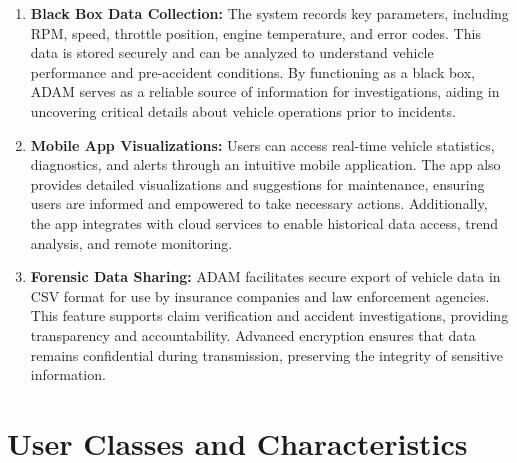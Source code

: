 \begin{enumerate}
    \item \textbf{Black Box Data Collection:} The system records key parameters, including RPM, speed, throttle position, engine temperature, and error codes. This data is stored securely and can be analyzed to understand vehicle performance and pre-accident conditions. By functioning as a black box, ADAM serves as a reliable source of information for investigations, aiding in uncovering critical details about vehicle operations prior to incidents.

    \item \textbf{Mobile App Visualizations:} Users can access real-time vehicle statistics, diagnostics, and alerts through an intuitive mobile application. The app also provides detailed visualizations and suggestions for maintenance, ensuring users are informed and empowered to take necessary actions. Additionally, the app integrates with cloud services to enable historical data access, trend analysis, and remote monitoring.
    \item \textbf{Forensic Data Sharing:} ADAM facilitates secure export of vehicle data in CSV format for use by insurance companies and law enforcement agencies. This feature supports claim verification and accident investigations, providing transparency and accountability. Advanced encryption ensures that data remains confidential during transmission, preserving the integrity of sensitive information.
\end{enumerate}

\section{User Classes and Characteristics}

